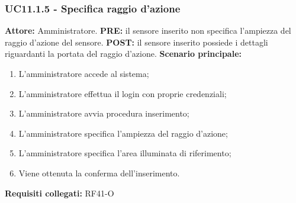 \documentclass[a4paper, 12pt]{article}
\begin{document}
\subsubsection{UC11.1.5 - Specifica raggio d'azione}
\textbf{Attore:} Amministratore.\newline
\textbf{PRE:} il sensore inserito non specifica l'ampiezza del raggio d'azione del sensore.\newline
\textbf{POST:} il sensore inserito possiede i dettagli riguardanti la portata del raggio d'azione.\newline
\textbf{Scenario principale:}
\begin{enumerate}
    \item L'amministratore accede al sistema;
    \item L'amministratore effettua il login con proprie credenziali;
    \item L'amministratore avvia procedura inserimento;
    \item L'amministratore specifica l'ampiezza del raggio d'azione;
    \item L'amministratore specifica l'area illuminata di riferimento;
    \item Viene ottenuta la conferma dell'inserimento.
\end{enumerate}
\textbf{Requisiti collegati:} RF41-O\newline
\end{document}
